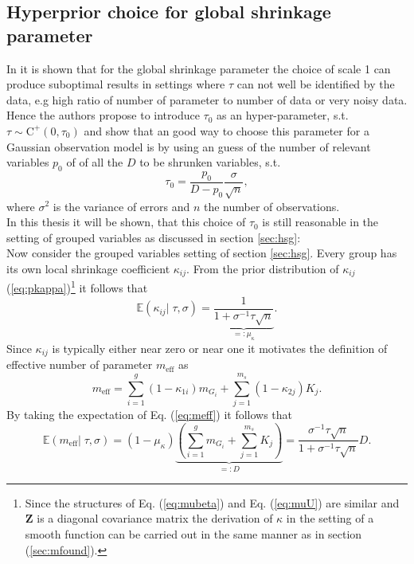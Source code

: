 \documentclass[12pt,letterpaper]{article}
\numberwithin{equation}{subsection}
\begin{document}
\subsection{Hyperprior choice for global shrinkage parameter}
\label{sec:opt}
In \cite{horseshoe} it is shown that for the global shrinkage parameter the choice of scale 1 can produce suboptimal results  in settings where $\tau$ can not well be identified by the data, e.g high ratio of number of parameter to number of data or very noisy data. Hence the authors propose to introduce $\tau_0$ as an hyper-parameter, s.t. $\tau \sim \text{C}^+(0,\tau_0)$ and show that an good way to choose this parameter for a Gaussian observation model is by using an guess of the number of relevant variables $p_0$ of of all the $D$ to be shrunken variables, s.t.
\begin{equation}
\tau_0 = \frac{p_0}{D-p_0}\frac{\sigma}{\sqrt{n}},
\label{eq:tau0}
\end{equation}
where $\sigma^2$ is the variance of errors and $n$ the number of observations. \\
In this thesis it will be shown, that this choice of $\tau_0$ is still reasonable in the setting of grouped variables as discussed in section \ref{sec:hsg}: \\
Now consider the grouped variables setting of section \ref{sec:hsg}. 
Every group has its own local shrinkage coefficient $\kappa_{ij}$.
From the prior distribution of $\kappa_{ij}$ (\ref{eq:pkappa})\footnote{Since the structures of Eq. (\ref{eq:mubeta}) and Eq. (\ref{eq:muU}) are similar and $\mathbf{Z}$ is a diagonal covariance matrix the derivation of $\kappa$ in the setting of a smooth function can be carried out in the same manner as in section (\ref{sec:mfound}).} it follows that
\begin{equation}
\mathbb{E}(\kappa_{ij}|\; \tau, \sigma) = \underbrace{\frac{1}{1+\sigma^{-1}\tau\sqrt{n}}}_{=:\mu_\kappa}.
\end{equation}
Since $\kappa_{ij}$ is typically either near zero or near one it motivates the definition of effective number of parameter $m_{\text{eff}}$ as 
\begin{equation}
m_{\text{eff}} = \sum^g_{i=1}(1-\kappa_{1i})m_{G_i} + \sum^{m_s}_{j=1}(1-\kappa_{2j})K_j.
\label{eq:meff}
\end{equation}
By taking the expectation of Eq. (\ref{eq:meff}) it follows that
\begin{equation}
\mathbb{E}(m_{\text{eff}}|\; \tau, \sigma) = (1-\mu_\kappa)\underbrace{( \sum^g_{i=1}m_{G_i} + \sum^{m_s}_{j=1}K_j)}_{=: D} = \frac{\sigma^{-1}\tau\sqrt{n}}{1+\sigma^{-1}\tau\sqrt{n}}D.
\label{eq:meffg}
\end{equation}
\end{document}
